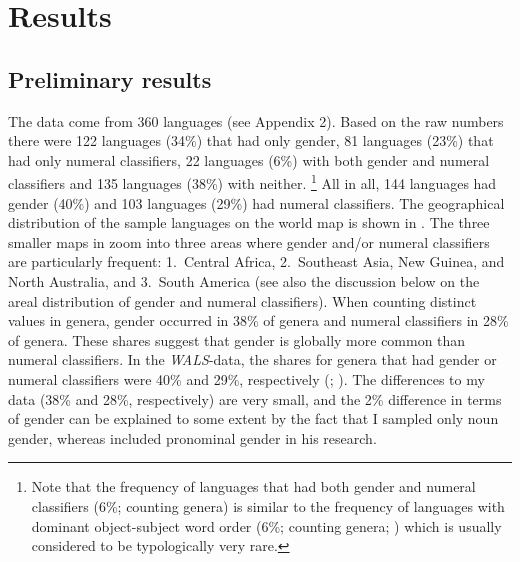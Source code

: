 \documentclass[output=collectionpaper]{langsci/langscibook}
\begin{document}
\section{Results}
\label{sec:Sinne:4}

\subsection{Preliminary results}
\label{sec:Sinne:4.1}

The data come from 360 languages (see Appendix 2). Based on the raw numbers there were 122 languages (34\%) that had only gender, 81 languages (23\%) that had only numeral classifiers, 22 languages (6\%) with both gender and numeral classifiers and 135 languages (38\%) with neither.%
\footnote{Note that the frequency of languages that had both gender and numeral classifiers (6\%; counting genera) is similar to the frequency of languages with dominant object-subject word order (6\%; counting genera; \citealt{wals-81}) which is usually considered to be typologically very rare.} %
All in all, 144 languages had gender (40\%) and 103 languages (29\%) had numeral classifiers. The geographical distribution of the sample languages on the world map is shown in . The three smaller maps in  zoom into three areas where gender and/or numeral classifiers are particularly frequent: 1.~Central Africa, 2.~Southeast Asia, New Guinea, and North Australia, and 3.~South America (see also the discussion below on the areal distribution of gender and numeral classifiers). When counting distinct values in genera, gender occurred in 38\% of genera and numeral classifiers in 28\% of genera. These shares suggest that gender is globally more common than numeral classifiers. In the \textit{WALS}-data, the shares for genera that had gender or numeral classifiers were 40\% and 29\%, respectively (\citealt{Corbett2013}; \citealt{Gil2013}). The differences to my data (38\% and 28\%, respectively) are very small, and the 2\% difference in terms of gender can be explained to some extent by the fact that I sampled only noun gender, whereas \citet{Corbett2013} included pronominal gender in his research.
\end{document}
